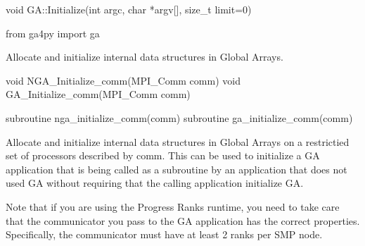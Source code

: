 \documentclass[12pt]{article}
\begin{document}
\begin{cxxapi}
\begin{cxxcode}
void GA::Initialize(int argc, char *argv[], size_t limit=0)
\end{cxxcode}
\begin{funcargs}
\end{funcargs}
\end{cxxapi}

\begin{pyapi}
\begin{pycode}
from ga4py import ga
\end{pycode}
\end{pyapi}

\gcoll

\begin{desc}

Allocate and initialize internal data structures in Global Arrays.

\end{desc}



\begin{capi}
\begin{ccode}
void NGA_Initialize_comm(MPI_Comm comm)
void GA_Initialize_comm(MPI_Comm comm)
\end{ccode}
\begin{funcargs}
\end{funcargs}
\end{capi}

\begin{fapi}
\begin{fcode}
subroutine nga_initialize_comm(comm)
subroutine ga_initialize_comm(comm)
\end{fcode}
\begin{funcargs}
\end{funcargs}
\end{fapi}

\gcoll

\begin{desc}

Allocate and initialize internal data structures in Global Arrays on a
restrictied set of processors described by comm. This can be used to initialize
a GA application that is being called as a subroutine by an application that
does not used GA without requiring that the calling application initialize GA.

Note that if you are using the Progress Ranks runtime, you need to take care
that the communicator you pass to the GA application has the correct properties.
Specifically, the communicator must have at least 2 ranks per SMP node.
\end{desc}
\end{document}
